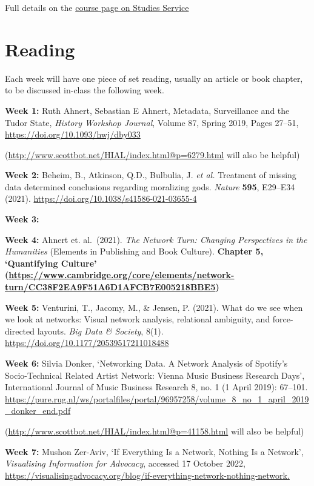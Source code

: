 \documentclass[
]{book}
\begin{document}
Full details on the \href{https://studies.helsinki.fi/courses/cur/hy-opt-cur-2223-7c9cdedc-fc7b-4e66-b793-1dbe0db868b7}{course page on Studies
Service}

\hypertarget{reading}{%
\section{Reading}\label{reading}}

Each week will have one piece of set reading, usually an article or book
chapter, to be discussed in-class the following week.

\textbf{Week 1:} Ruth Ahnert, Sebastian E Ahnert, Metadata, Surveillance and
the Tudor State, \emph{History Workshop Journal}, Volume 87, Spring 2019,
Pages 27--51, \url{https://doi.org/10.1093/hwj/dby033}

(\url{http://www.scottbot.net/HIAL/index.html@p=6279.html}
will also be helpful)

\textbf{Week 2:} Beheim, B., Atkinson, Q.D., Bulbulia, J. \emph{et al.} Treatment
of missing data determined conclusions regarding moralizing gods.
\emph{Nature} \textbf{595}, E29--E34 (2021).
\url{https://doi.org/10.1038/s41586-021-03655-4}

\textbf{Week 3:}

\textbf{Week 4:} Ahnert et. al.~(2021). \emph{The Network Turn: Changing
Perspectives in the Humanities} (Elements in Publishing and Book
Culture). \textbf{Chapter 5, `Quantifying Culture'
(\url{https://www.cambridge.org/core/elements/network-turn/CC38F2EA9F51A6D1AFCB7E005218BBE5})}

\textbf{Week 5:} Venturini, T., Jacomy, M., \& Jensen, P. (2021). What do we
see when we look at networks: Visual network analysis, relational
ambiguity, and force-directed layouts. \emph{Big Data \& Society}, 8(1).
\url{https://doi.org/10.1177/20539517211018488}

\textbf{Week 6:} Silvia Donker, `Networking Data. A Network Analysis of
Spotify's Socio-Technical Related Artist Network: Vienna Music Business
Research Days', International Journal of Music Business Research 8, no.
1 (1 April 2019): 67--101.
\url{https://pure.rug.nl/ws/portalfiles/portal/96957258/volume_8_no_1_april_2019_donker_end.pdf}

(\url{http://www.scottbot.net/HIAL/index.html@p=41158.html}
will also be helpful)

\textbf{Week 7:} Mushon Zer-Aviv, `If Everything Is a Network, Nothing Is a
Network', \emph{Visualising Information for Advocacy}, accessed 17 October
2022,
\url{https://visualisingadvocacy.org/blog/if-everything-network-nothing-network.}
\end{document}
